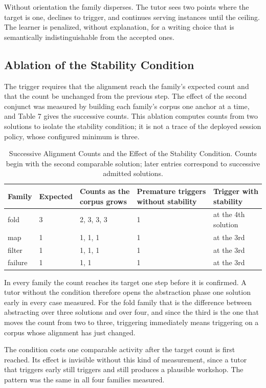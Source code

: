 \documentclass[10pt,twocolumn,letterpaper]{article}
\begin{document}
Without orientation the family disperses. The tutor sees two points
where the target is one, declines to trigger, and continues serving
instances until the ceiling. The learner is penalized, without
explanation, for a writing choice that is semantically indistinguishable
from the accepted ones.

\subsection{Ablation of the Stability Condition}
The trigger requires that the alignment reach the family's expected
count and that the count be unchanged from the previous step. The effect
of the second conjunct was measured by building each family's corpus one
anchor at a time, and Table 7 gives the successive counts.
This ablation computes counts from two solutions to isolate the stability
condition; it is not a trace of the deployed session policy, whose
configured minimum is three.

\begin{table}[t]
\centering\scriptsize
\caption{Successive Alignment Counts and the Effect of the Stability Condition. Counts begin with the second comparable solution; later entries correspond to successive admitted solutions.}
\begin{tabular}{@{}p{1.00in}p{0.55in}p{1.55in}p{1.85in}p{1.45in}@{}}
\toprule
Family & Expected & Counts as the corpus grows & Premature triggers without stability & Trigger with stability \\
\midrule
fold & 3 & 2, 3, 3, 3 & 1 & at the 4th solution \\
map & 1 & 1, 1, 1 & 1 & at the 3rd \\
filter & 1 & 1, 1, 1 & 1 & at the 3rd \\
failure & 1 & 1, 1 & 1 & at the 3rd \\
\bottomrule
\end{tabular}
\end{table}

In every family the count reaches its target one step before it is
confirmed. A tutor without the condition therefore opens the abstraction
phase one solution early in every case measured. For the fold family
that is the difference between abstracting over three solutions and over
four, and since the third is the one that moves the count from two to
three, triggering immediately means triggering on a corpus whose
alignment has just changed.

The condition costs one comparable activity after the target count is first reached. Its effect is invisible
without this kind of measurement, since a tutor that triggers early
still triggers and still produces a plausible workshop. The pattern was
the same in all four families measured.
\end{document}

